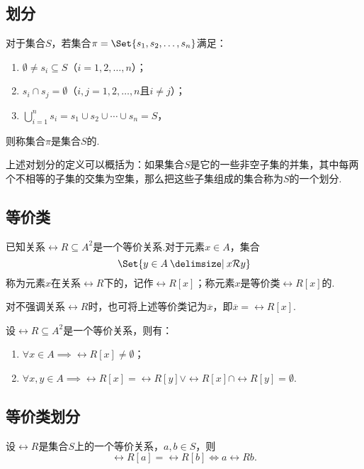 \subsection{划分}
\begin{definition}
对于集合\(S\)，若集合\(\pi = \Set{ s_1,s_2,\dotsc,s_n }\)满足：
\begin{enumerate}
 \item \(\emptyset \neq s_i \subseteq S\)（\(i=1,2,\dotsc,n\)）；
 \item \(s_i \cap s_j = \emptyset\)（\(i,j=1,2,\dotsc,n\)且\(i \neq j\)）；
 \item \(\bigcup\limits_{i=1}^n s_i = s_1 \cup s_2 \cup \dotsb \cup s_n = S\)，%
\end{enumerate}
则称集合\(\pi\)是集合\(S\)的.
\end{definition}
上述对划分的定义可以概括为：如果集合\(S\)是它的一些非空子集的并集，其中每两个不相等的子集的交集为空集，那么把这些子集组成的集合称为\(S\)的一个划分.


\subsection{等价类}
\begin{definition}
\def\R{\rel{R}}
已知关系\(\R \subseteq A^2\)是一个等价关系.对于元素\(x \in A\)，集合\[
\Set{y \in A \given x \R y}
\]称为元素\(x\)在关系\(\R\)下的，记作\(\R[x]\)；称元素\(x\)是等价类\(\R[x]\)的.

对不强调关系\(\R\)时，也可将上述等价类记为\(\overline{x}\)，即\(\overline{x} = \R[x]\).
\end{definition}

\begin{property}
\def\R{\rel{R}}
设\(\R \subseteq A^2\)是一个等价关系，则有：
\begin{enumerate}
 \item \(\forall x \in A \implies \R[x] \neq \emptyset\)；
 \item \(\forall x,y \in A \implies \R[x] = \R[y] \lor \R[x] \cap \R[y] = \emptyset\).
\end{enumerate}
\end{property}

\subsection{等价类划分}
\begin{lemma}
设\(\rel{R}\)是集合\(S\)上的一个等价关系，\(a,b \in S\)，则\[
\rel{R}[a] = \rel{R}[b] \iff a \rel{R} b.
\]
\end{lemma}

